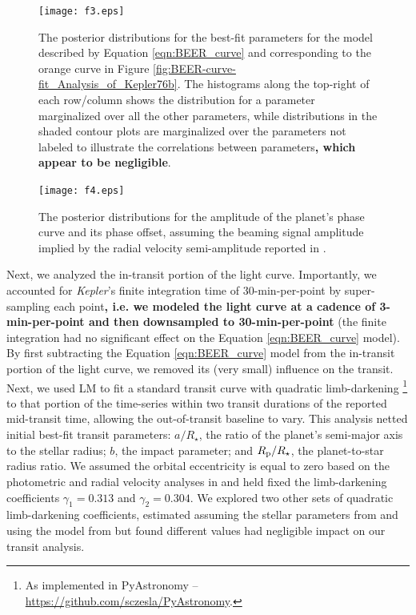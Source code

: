 \documentclass[manuscript]{aastex62}
\newcommand{\kepler}{{\it Kepler}}
\begin{document}
\begin{figure}
\texttt{[image: f3.eps]}
\caption{The posterior distributions for the best-fit parameters for the model described by Equation \ref{eqn:BEER_curve} and corresponding to the orange curve in Figure \ref{fig:BEER-curve-fit_Analysis_of_Kepler76b}. The histograms along the top-right of each row/column shows the distribution for a parameter marginalized over all the other parameters, while distributions in the shaded contour plots are marginalized over the parameters not labeled to illustrate the correlations between parameters\textbf{, which appear to be negligible}. \label{fig:BEER-curve-fit-params_Analysis-of-Kepler76b}}
\end{figure}

\begin{figure}
\texttt{[image: f4.eps]}
\caption{The posterior distributions for the amplitude of the planet's phase curve and its phase offset, assuming the beaming signal amplitude implied by the radial velocity semi-amplitude reported in \citet{2013ApJ...771...26F}. \label{fig:Aplanet-delta-fit-params_Analysis-of-Kepler76b}}
\end{figure}

Next, we analyzed the in-transit portion of the light curve. Importantly, we accounted for \kepler's finite integration time of 30-min-per-point by super-sampling each point\textbf{, i.e. we modeled the light curve at a cadence of 3-min-per-point and then downsampled to 30-min-per-point} \citep[cf.][]{2010MNRAS.408.1758K} (the finite integration had no significant effect on the Equation \ref{eqn:BEER_curve} model). By first subtracting the Equation \ref{eqn:BEER_curve} model from the in-transit portion of the light curve, we removed its (very small) influence on the transit. Next, we used LM to fit a standard transit curve with quadratic limb-darkening \citep{2002ApJ...580L.171M}\footnote{As implemented in PyAstronomy -- \url{https://github.com/sczesla/PyAstronomy}.} to that portion of the time-series within two transit durations of the reported mid-transit time, allowing the out-of-transit baseline to vary. This analysis netted initial best-fit transit parameters: $a/R_\star$, the ratio of the planet's semi-major axis to the stellar radius; $b$, the impact parameter; and $R_{\rm p}/R_\star$, the planet-to-star radius ratio. We assumed the orbital eccentricity is equal to zero based on the photometric and radial velocity analyses in \citet{2013ApJ...771...26F} and held fixed the limb-darkening coefficients $\gamma_1 = 0.313$ and $\gamma_2 = 0.304$. We explored two other sets of quadratic limb-darkening coefficients, estimated assuming the stellar parameters from \citet{2013ApJ...771...26F} and using the model from \citet{2015MNRAS.450.1879E} but found different values had negligible impact on our transit analysis. 
\end{document}
